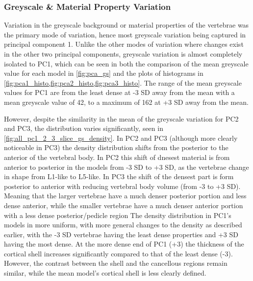 \subsubsection{Greyscale \& Material Property Variation}

Variation in the greyscale background or material properties of the vertebrae
was the primary mode of variation, hence most greyscale variation being
captured in principal component 1.  Unlike the other modes of variation where
changes exist in the other two principal components, greyscale variation is
almost completely isolated to PC1, which can be seen in both the comparison of
the mean greyscale value for each model in \cref{fig:pca_gs} and the plots of
histograms in \cref{fig:pca1_histo,fig:pca2_histo,fig:pca3_histo}.  The range
of the mean greyscale values for PC1 are from the least dense at -3 SD away
from the mean with a mean greyscale value of 42, to a maximum of 162 at +3 SD
away from the mean.

However, despite the similarity in the mean of the greyscale variation for PC2
and PC3, the distribution varies significantly, seen in
\cref{fig:all_pc1_2_3_slice_gs_density}.  In PC2 and PC3 (although more clearly
noticeable in PC3) the density distribution shifts from the posterior to the
anterior of the vertebral body.  In PC2 this shift of dnesest material is from
anterior to posterior in the models from -3 SD to +3 SD, as the vertebrae
change in shape from L1-like to L5-like.  In PC3 the shift of the densest part
is form posterior to anterior with reducing vertebral body volume (from -3 to
+3 SD).  Meaning that the larger vertebrae have a much denser posterior portion
and less dense anterior, while the smaller vertebrae have a much denser
anterior portion with a less dense posterior/pedicle region The density
distribution in PC1's models in more uniform, with more general changes to the
density as described earlier, with the -3 SD vertebrae having the least dense
properties and +3 SD having the most dense.  At the more dense end of PC1 (+3)
the thickness of the cortical shell increases significantly compared to that of
the least dense (-3).  However, the contrast between the shell and the
cancellous regions remain similar, while the mean model's cortical shell is
less clearly defined.


